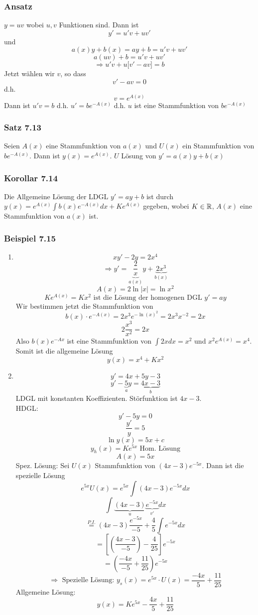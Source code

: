 \subsubsection*{Ansatz}
$y=uv$ wobei $u,v$ Funktionen sind. Dann ist \[y'=u'v+uv'\] und \[a(x)y+b(x)=ay+b=u'v+uv'\]
\[a(uv)+b=u'v+uv'\]
\[\Rightarrow u'v+u\lbrack v'-av\rbrack =b\]
Jetzt wählen wir $v$, so dass \[v'-av=0\]d.h. \[v=e^{A(x)}\] Dann ist $u'v=b$ d.h. $u'=be^{-A(x)}$ d.h. $u$ ist eine Stammfunktion von $be^{-A(x)}$

\subsubsection*{Satz 7.13}
Seien $A(x)$ eine Stammfunktion von $a(x)$ und $U(x)$ ein Stammfunktion von $be^{-A(x)}$. Dann ist $y(x)=e^{A(x)}$. $U$ Lösung von $y'=a(x)y+b(x)$

\subsubsection*{Korollar 7.14}
Die Allgemeine Lösung der LDGL $y'=ay+b$ ist durch $y(x)=e^{A(x)}\int{b(x)e^{-A(x)} dx}+Ke^{A(x)}$ gegeben, wobei $K\in\mathbb{R}$, $A(x)$ eine Stammfunktion von $a(x)$ ist.

\subsubsection*{Beispiel 7.15}
\begin{enumerate}
\item \[xy'-2y=2x^4\]
\[\Rightarrow y' = \underbrace {\frac{2}{x}}_{a(x)}y + \underbrace {2{x^3}}_{b(x)}\]
\[A(x)=2\ln\left| x \right|=\ln x^2\]
\[Ke^{A(x)}=Kx^2\text{ ist die Lösung der homogenen DGL }y'=ay\]
Wir bestimmen jetzt die Stammfunktion von \[b(x)\cdot e^{-A(x)}=2x^3e^{-\ln (x)^2}=2x^3 x^{-2}=2x\]
\[2\frac{x^3}{x^2}=2x\]
Also $b(x)e^{-Ax}$ ist eine Stammfunktion von $\int{2xdx=x^2}$ und $x^2e^{A(x)}=x^4$. Somit ist die allgemeine Lösung \[y(x)=x^4+Kx^2\]
\item \[y'=4x+5y-3\]
\[y' - \underbrace 5_ay = \underbrace {4x - 3}_b\]
LDGL mit konstanten Koeffizienten. Störfunktion ist  $4x-3$.\\

\noindent HDGL: \[y'-5y=0\]
\[\frac{y'}{y}=5\]
\[\ln y(x)=5x+c\]
\[y_h(x)=Ke^{5x} \text{ Hom. Lösung}\]
\[A(x)=5x\]
Spez. Lösung: Sei $U(x)$ Stammfunktion von $(4x-3)e^{-5x}$. Dann ist die spezielle Lösung \[e^{5x}U(x)=e^{5x}\int{(4x-3)e^{-5x}dx}\]
\[ \int {\underbrace {(4x - 3)}_u\underbrace {{e^{ - 5x}}}_{v'}dx} \]
\[\mathop = \limits^{P.I.} (4x - 3)\frac{{{e^{ - 5x}}}}{{ - 5}} + \frac{4}{5}\int {{e^{ - 5x}}dx}\]
\[ = \left[ {\left( {\frac{{4x - 3}}{{ - 5}}} \right) - \frac{4}{{25}}} \right]{e^{ - 5x}}\]
\[ = \left( {\frac{{ - 4x}}{{ - 5}} + \frac{{11}}{{25}}} \right){e^{ - 5x}}\]
\[\Rightarrow \text{ Spezielle Lösung: }y_s(x)=e^{5x}\cdot U(x)=\frac{-4x}{5}+\frac{11}{25}\]
Allgemeine Lösung: \[y(x)=Ke^{5x}-\frac{4x}{5}+\frac{11}{25}\]
\end{enumerate}

